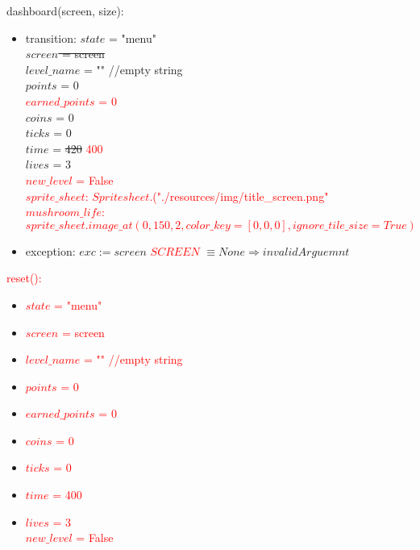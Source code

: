 \documentclass[12pt]{article}
\begin{document}
\noindent dashboard(screen, size):
\begin{itemize}
    \item transition:
    $state$ = "menu" \\
    \sout{$screen$ = screen} \\
    $level\_name$ = "" //empty string \\
    $points$ = 0 \\
    \textcolor{red}{$earned\_points$ = 0} \\
    $coins$ = 0 \\
    $ticks$ = 0 \\
    $time$ = \sout{420} \textcolor{red}{400} \\
    $lives$ = $3$ \\
    \textcolor{red}{$new\_level$ = False} \\
    \textcolor{red}{$sprite\_sheet$: $Spritesheet.$("./resources/img/title\_screen.png"} \\
    \textcolor{red}{$mushroom\_life$: $sprite\_sheet.image\_at(0, 150, 2, color\_key = [0,0,0], ignore\_tile\_size = True)$}
    \item exception: $exc := $\sout{$screen$} \textcolor{red}{$SCREEN$} $\equiv None \Rightarrow invalidArguemnt$
\end{itemize}

\noindent \textcolor{red}{reset():}
\begin{itemize}
    \item  \textcolor{red}{$state$ = "menu"} \\
    \item \textcolor{red}{$screen$ = screen} \\
    \item \textcolor{red}{$level\_name$ = "" //empty string} \\
    \item \textcolor{red}{$points$ = 0} \\
    \item \textcolor{red}{$earned\_points$ = 0} \\
    \item \textcolor{red}{$coins$ = 0} \\
    \item \textcolor{red}{$ticks$ = 0} \\
    \item \textcolor{red}{$time$ = \textcolor{red}{400} } \\
    \item \textcolor{red}{$lives$ = $3$ } \\
    \textcolor{red}{$new\_level$ = False} \\
\end{itemize}
\end{document}
